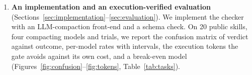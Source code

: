 \documentclass{article}
\theoremstyle{plain}
\theoremstyle{definition}
\newcommand{\bnew}{\begingroup\color{revblue}}
\newcommand{\bnew}{\begingroup}
\newcommand{\enew}{\endgroup}
\begin{document}
\begin{enumerate}
%
\item \textbf{An implementation and an execution-verified evaluation}
(Sections~\ref{sec:implementation}--\ref{sec:evaluation}). We implement the
checker with an LLM-compaction front-end and a schema check. On 20 public
skills, four compacting models and \ValueTrials{} trials, we report the
confusion matrix of verdict against outcome, per-model rates with intervals,
the execution tokens the gate avoids against its own cost, and a break-even
model (Figures~\ref{fig:confusion}--\ref{fig:tokens}, Table~\ref{tab:tasks}).

\end{enumerate}
\end{document}
